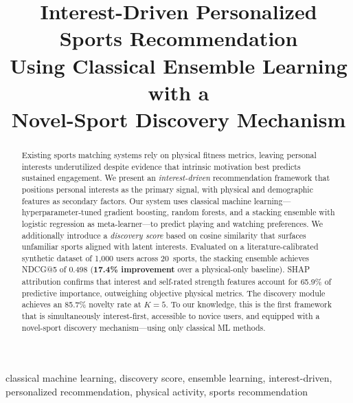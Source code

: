 \documentclass[conference]{IEEEtran}
\begin{document}
\title{Interest-Driven Personalized Sports Recommendation\\
Using Classical Ensemble Learning with a\\
Novel-Sport Discovery Mechanism}

\author{
}

\maketitle

\begin{abstract}
Existing sports matching systems rely on physical fitness metrics,
leaving personal interests underutilized despite evidence that
intrinsic motivation best predicts sustained engagement.
We present an \textit{interest-driven} recommendation framework
that positions personal interests as the primary signal, with physical
and demographic features as secondary factors.
Our system uses classical machine learning---hyperparameter-tuned
gradient boosting, random forests, and a stacking ensemble with
logistic regression as meta-learner---to predict playing and watching
preferences.
We additionally introduce a \textit{discovery score} based on
cosine similarity that surfaces unfamiliar sports aligned with
latent interests.
Evaluated on a literature-calibrated synthetic dataset of 1{,}000
users across 20~sports, the stacking ensemble achieves NDCG@5 of
0.498 (\textbf{17.4\% improvement} over a physical-only baseline).
SHAP attribution confirms that interest and self-rated strength
features account for 65.9\% of predictive importance, outweighing
objective physical metrics.
The discovery module achieves an 85.7\% novelty rate at $K{=}5$.
To our knowledge, this is the first framework that is simultaneously
interest-first, accessible to novice users, and equipped with a
novel-sport discovery mechanism---using only classical ML methods.
\end{abstract}

\begin{IEEEkeywords}
classical machine learning, discovery score, ensemble learning,
interest-driven, personalized recommendation, physical activity,
sports recommendation
\end{IEEEkeywords}
\end{document}

